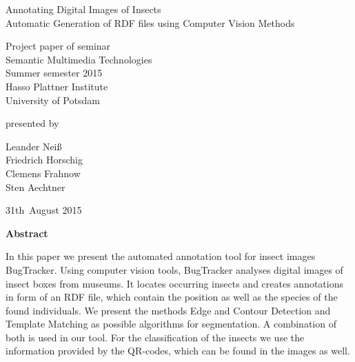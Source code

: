 \documentclass[11pt, a4paper]{article}
\begin{document}
          

\begin{titlepage}
  \begin{center} 
    \mbox{}
    \vspace{1cm}
    
    {\huge Annotating Digital Images of Insects \\[1em] {\LARGE Automatic Generation of RDF files using Computer Vision Methods}}  
        
    \vspace{4cm}
    
    Project paper of seminar \\[1em]
    {\large \sc Semantic Multimedia Technologies} \\[1em]
    Summer semester 2015 \\[1em]
    Hasso Plattner Institute \\[1em]
    University of Potsdam
    
    \vspace{4cm}
    
		presented by
		
    \vspace{1em}
    
		{\Large Leander Neiß} \\
		{\Large Friedrich Horschig}\\
		{\Large Clemens Frahnow}\\
		{\Large Sten Aechtner}
		
    \vspace{4em}
    
    31th~August 2015
  \end{center}
\end{titlepage}


\setcounter{page}{1}

\begin{center}
{\bf Abstract} 
\end{center}

\noindent
In this paper we present the automated annotation tool for insect images BugTracker.
Using computer vision tools, BugTracker analyses digital images of insect boxes from museums.
It locates occurring insects and creates annotations in form of an RDF file, which contain the position as well as the species of the found individuals.
We present the methods Edge and Contour Detection and Template Matching as possible algorithms for segmentation.
A combination of both is used in our tool.
For the classification of the insects we use the information provided by the QR-codes, which can be found in the images as well.
\end{document}
